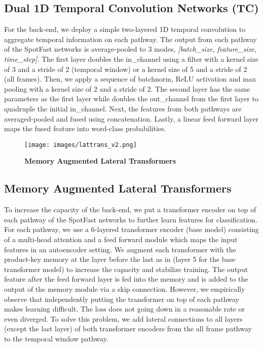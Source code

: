 \documentclass{article}
\begin{document}
\subsection{Dual 1D Temporal Convolution Networks (TC)}
For the back-end, we deploy a simple two-layered 1D temporal convolution to aggregate temporal information on each pathway. The output from each pathway of the SpotFast networks is average-pooled to 3 modes, \textit{[batch\_size, feature\_size, time\_step]}. The first layer doubles the in\_channel using a filter with a kernel size of 3 and a stride of 2 (temporal window) or a kernel size of 5 and a stride of 2 (all frames). Then, we apply a sequence of batchnorm, ReLU activation and max pooling with a kernel size of 2 and a stride of 2. The second layer has the same parameters as the first layer while doubles the out\_channel from the first layer to quadruple the initial in\_channel. Next, the features from both pathways are averaged-pooled and fused using concatenation. Lastly, a linear feed forward layer maps the fused feature into word-class probabilities.

\begin{figure}[t] 
\begin{center}
   \texttt{[image: images/lattrans\_v2.png]}
\end{center}
\vspace{-1.5\baselineskip}
   \caption{\textbf{Memory Augmented Lateral Transformers}}
   \label{sys_overview}
\label{fig:long}
\label{fig:onecol}
\vspace{-1\baselineskip}
\end{figure}

\subsection{Memory Augmented Lateral Transformers}
To increase the capacity of the back-end, we put a transformer encoder on top of each pathway of the SpotFast networks to further learn features for classification. For each pathway, we use a 6-layered transformer encoder (base model) consisting of a multi-head attention and a feed forward module which maps the input features in an autoencoder setting. We augment each transformer with the product-key memory at the layer before the last as in \cite{lample2019large} (layer 5 for the base transformer model) to increase the capacity and stabilize training. The output feature after the feed forward layer is fed into the memory and is added to the output of the memory module via a skip connection. However, we empirically observe that independently putting the transformer on top of each pathway makes learning difficult. The loss does not going down in a reasonable rate or even diverged. To solve this problem, we add lateral connections to all layers (except the last layer) of both transformer encoders from the all frame pathway to the temporal window pathway. 
\end{document}
